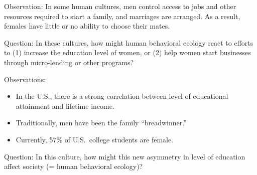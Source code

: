 \begin{frame}[t]
    \begin{adjustwidth}{-2em}{-1.5em}
        Observation: In some human cultures, men control access to jobs and
        other resources required to start a family, and marriages are arranged.
        As a result, females have little or no ability to choose their mates. 

        \vspace{5mm}
        Question: In these cultures, how might human behavioral ecology react
        to efforts to (1) increase the education level of women, or (2) help
        women start businesses through micro-lending or other programs? 


    \end{adjustwidth}
\end{frame}

\begin{frame}[t]
    \begin{adjustwidth}{-2em}{-1.5em}
        Observations:

        \begin{itemize}
            \item In the U.S., there is a strong correlation between
                level of educational attainment and lifetime income.
            
            \item Traditionally, men have been the family ``breadwinner.''

            \item Currently, 57\% of U.S.\ college students are female.
        \end{itemize}

        Question: In this culture, how might this new asymmetry in level of
        education affect society (= human behavioral ecology)?


    \end{adjustwidth}
\end{frame}

